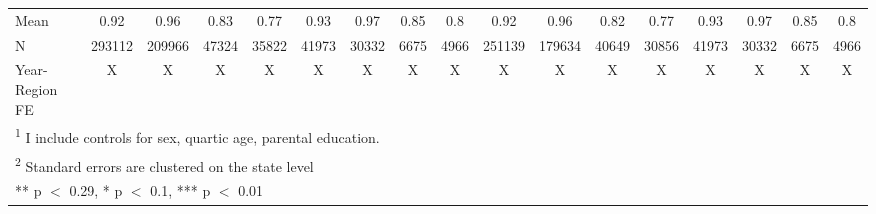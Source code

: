 \begin{landscape}
\begin{table}[!h]
{\begin{tabular}[t]{lcccccccccccccccc}
\midrule
Mean & \num{0.92} & \num{0.96} & \num{0.83} & \num{0.77} & \num{0.93} & \num{0.97} & \num{0.85} & \num{0.8} & \num{0.92} & \num{0.96} & \num{0.82} & \num{0.77} & \num{0.93} & \num{0.97} & \num{0.85} & \num{0.8}\\
N & \num{293112} & \num{209966} & \num{47324} & \num{35822} & \num{41973} & \num{30332} & \num{6675} & \num{4966} & \num{251139} & \num{179634} & \num{40649} & \num{30856} & \num{41973} & \num{30332} & \num{6675} & \num{4966}\\
Year-Region FE & X & X & X & X & X & X & X & X & X & X & X & X & X & X & X & X\\
\bottomrule
\multicolumn{17}{l}{\rule{0pt}{1em}\textsuperscript{1} I include controls for sex, quartic age, parental education.}\\
\multicolumn{17}{l}{\rule{0pt}{1em}\textsuperscript{2} Standard errors are clustered on the state level}\\
\multicolumn{17}{l}{\rule{0pt}{1em}** p $<$ 0.29, * p $<$ 0.1, *** p $<$ 0.01}\\
\end{tabular}}
\end{table}
\end{landscape}
